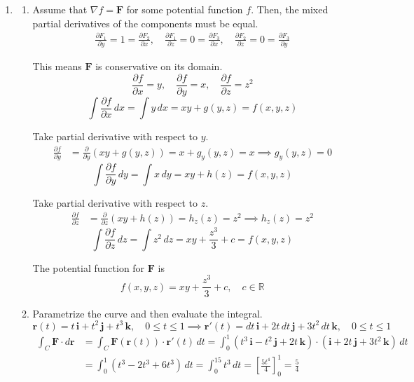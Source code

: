 \documentclass[a4paper, 12pt]{article}
\begin{document}
\begin{enumerate}[leftmargin=*,label=\textbf{\arabic*.}]
\item \begin{enumerate}[leftmargin=*,label=\textbf{\alph*.}]
\item Assume that $\nabla f=\mathbf{F}$ for some potential function $f$. Then, the mixed partial derivatives of the components must be equal.
\[
\begin{array}{c}
\displaystyle\frac{\partial{F}_1}{\partial y}=1=\frac{\partial{F}_2}{\partial x},\quad\frac{\partial{F}_1}{\partial z}=0=\frac{\partial{F}_3}{\partial x},\quad\frac{\partial{F}_2}{\partial z}=0=\frac{\partial{F}_3}{\partial y}
\end{array}
\]

This means $\mathbf{F}$ is conservative on its domain.
\[\frac{\partial f}{\partial x}=y,\quad\frac{\partial f}{\partial y}=x,\quad\frac{\partial f}{\partial z}=z^2\]
\[\int\frac{\partial f}{\partial x}\,dx=\int y\,dx=xy+g(y,z)=f(x,y,z)\]

Take partial derivative with respect to $y$.
\begin{align*}\frac{\partial f}{\partial y}&=\frac{\partial}{\partial y}\left(xy+g(y,z)\right)=x+g_y(y,z)=x\implies g_y(y,z)=0\end{align*}
\[\int\frac{\partial f}{\partial y}\,dy=\int x\,dy=xy+h(z)=f(x,y,z)\]

Take partial derivative with respect to $z$.
\begin{align*}\frac{\partial f}{\partial z}&=\frac{\partial}{\partial z}\left(xy+h(z)\right)=h_z(z)=z^2\implies h_z(z)=z^2\end{align*}
\[\int\frac{\partial f}{\partial z}\,dz=\int z^2\,dz=xy+\frac{z^3}3+c=f(x,y,z)\]

The potential function for $\mathbf{F}$ is
\[\boxed{f(x,y,z)=xy+\frac{z^3}3+c,\quad c\in\mathbb{R}}\]

\item Parametrize the curve and then evaluate the integral.
\[\mathbf{r}(t)=t\,\mathbf{i}+t^2\,\mathbf{j}+t^3\,\mathbf{k},\quad0\leq t\leq1\implies\mathbf{r}'(t)=dt\,\mathbf{i}+2t\,dt\,\mathbf{j}+3t^2\,dt\,\mathbf{k},\quad0\leq t\leq1\]
\begin{align*}\int_C\mathbf{F}\cdot d\mathbf{r}&=\int_C\mathbf{F}(\mathbf{r}(t))\cdot\mathbf{r}'(t)\,dt=\int_0^1\left(t^3\,\mathbf{i}-t^2\,\mathbf{j}+2t\,\mathbf{k}\right)\cdot(\mathbf{i}+2t\,\mathbf{j}+3t^2\,\mathbf{k})\,dt\\[1em]&=\int_0^1\left(t^3-2t^3+6t^3\right)\,dt=\int_0^15t^3\,dt=\left[\frac{5t^4}4\right]_0^1=\boxed{\frac54}\end{align*}
\end{enumerate}
\end{enumerate}
\end{document}
